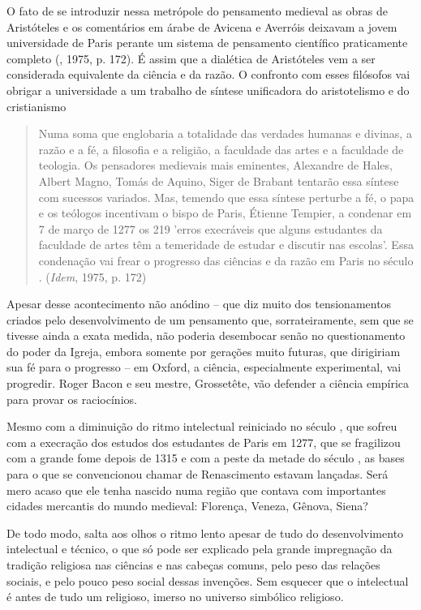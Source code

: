 O fato de se introduzir nessa metrópole do pensamento medieval as obras
de Aristóteles e os comentários em árabe de Avicena e Averróis deixavam
a jovem universidade de Paris perante um sistema de pensamento
científico praticamente completo (, 1975, p. 172). É assim que a
dialética de Aristóteles vem a ser considerada equivalente da ciência e
da razão. O confronto com esses filósofos vai obrigar a universidade a
um trabalho de síntese unificadora do aristotelismo e do cristianismo

\begin{quote}
Numa soma que englobaria a totalidade das verdades humanas e divinas, a
razão e a fé, a filosofia e a religião, a faculdade das artes e a
faculdade de teologia. Os pensadores medievais mais eminentes, Alexandre
de Hales, Albert Magno, Tomás de Aquino, Siger de Brabant tentarão essa
síntese com sucessos variados. Mas, temendo que essa síntese perturbe a
fé, o papa e os teólogos incentivam o bispo de Paris, Étienne Tempier, a
condenar em 7 de março de 1277 os 219 'erros execráveis que alguns
estudantes da faculdade de artes têm a temeridade de estudar e discutir
nas escolas'. Essa condenação vai frear o progresso das ciências e da
razão em Paris no século . (\emph{Idem}, 1975, p. 172)
\end{quote}

Apesar desse acontecimento não anódino -- que diz muito dos
tensionamentos criados pelo desenvolvimento de um pensamento que,
sorrateiramente, sem que se tivesse ainda a exata medida, não poderia
desembocar senão no questionamento do poder da Igreja, embora somente
por gerações muito futuras, que dirigiriam sua fé para o progresso -- em
Oxford, a ciência, especialmente experimental, vai progredir. Roger
Bacon e seu mestre, Grossetête, vão defender a ciência empírica para
provar os raciocínios.

Mesmo com a diminuição do ritmo intelectual reiniciado no século , que
sofreu com a execração dos estudos dos estudantes de Paris em 1277, que
se fragilizou com a grande fome depois de 1315 e com a peste da metade
do século , as bases para o que se convencionou chamar de
Renascimento estavam lançadas. Será mero acaso que ele tenha nascido
numa região que contava com importantes cidades mercantis do mundo
medieval: Florença, Veneza, Gênova, Siena?

De todo modo, salta aos olhos o ritmo lento apesar de tudo do
desenvolvimento intelectual e técnico, o que só pode ser explicado pela
grande impregnação da tradição religiosa nas ciências e nas cabeças
comuns, pelo peso das relações sociais, e pelo pouco peso social dessas
invenções. Sem esquecer que o intelectual é antes de tudo um religioso,
imerso no universo simbólico religioso.

